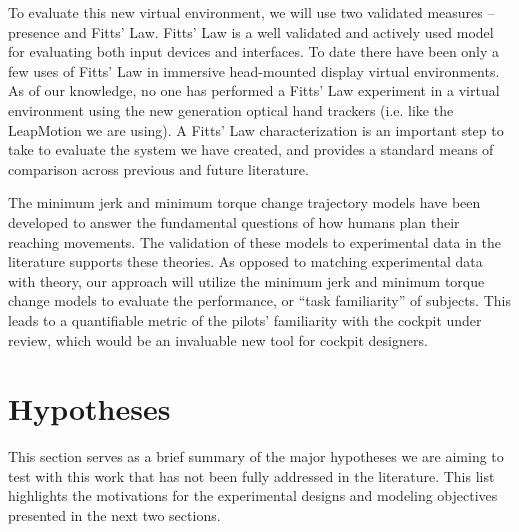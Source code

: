 To evaluate this new virtual environment, we will use two validated measures -- presence and Fitts' Law.
Fitts' Law is a well validated and actively used model for evaluating both input devices and interfaces.
To date there have been only a few uses of Fitts' Law in immersive head-mounted display virtual environments.
As of our knowledge, no one has performed a Fitts' Law experiment in a virtual environment using the new generation optical hand trackers (i.e.
like the LeapMotion we are using).
A Fitts' Law characterization is an important step to take to evaluate the system we have created, and provides a standard means of comparison across previous and future literature.

The minimum jerk and minimum torque change trajectory models have been developed to answer the fundamental questions of how humans plan their reaching movements.
The validation of these models to experimental data in the literature supports these theories.
As opposed to matching experimental data with theory, our approach will utilize the minimum jerk and minimum torque change models to evaluate the performance, or ``task familiarity'' of subjects.
This leads to a quantifiable metric of the pilots' familiarity with the cockpit under review, which would be an invaluable new tool for cockpit designers.

\section{Hypotheses}
\label{hypotheses}

This section serves as a brief summary of the major hypotheses we are aiming to test with this work that has not been fully addressed in the literature.
This list highlights the motivations for the experimental designs and modeling objectives presented in the next two sections.

